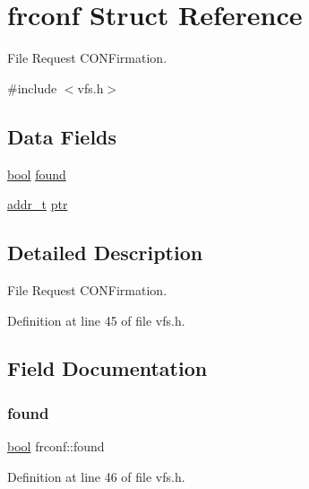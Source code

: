 \hypertarget{a00314}{}\section{frconf Struct Reference}
\label{a00314}


File Request C\+O\+N\+Firmation.  




{\ttfamily \#include $<$vfs.\+h$>$}

\subsection*{Data Fields}
\begin{DoxyCompactItemize}
\item 
\hyperlink{a00134_af6a258d8f3ee5206d682d799316314b1_af6a258d8f3ee5206d682d799316314b1}{bool} \hyperlink{a00314_aadd5ca2c6b0ddfb40e058f420907fd7d_aadd5ca2c6b0ddfb40e058f420907fd7d}{found}
\item 
\hyperlink{a00134_a295f71165288684c38c6bb836fbb3c59_a295f71165288684c38c6bb836fbb3c59}{addr\+\_\+t} \hyperlink{a00314_aca270be7272453f34e2b8d9f70142702_aca270be7272453f34e2b8d9f70142702}{ptr}
\end{DoxyCompactItemize}


\subsection{Detailed Description}
File Request C\+O\+N\+Firmation. 

Definition at line 45 of file vfs.\+h.



\subsection{Field Documentation}
\mbox{\label{a00314_aadd5ca2c6b0ddfb40e058f420907fd7d_aadd5ca2c6b0ddfb40e058f420907fd7d}} 
\subsubsection{\texorpdfstring{found}{found}}
{\footnotesize\ttfamily \hyperlink{a00134_af6a258d8f3ee5206d682d799316314b1_af6a258d8f3ee5206d682d799316314b1}{bool} frconf\+::found}



Definition at line 46 of file vfs.\+h.


